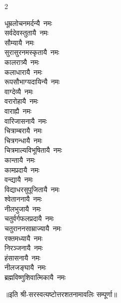 \begin{multicols}{2}
\begin{flushleft}
धूम्रलोचनमर्दन्यै~नमः\\
सर्वदेवस्तुतायै~नमः\\
सौम्यायै~नमः\\
सुरासुरनमस्कृतायै~नमः\\
कालरात्र्यै~नमः\\
कलाधारायै~नमः\\
रूपसौभाग्यदायिन्यै~नमः\\
वाग्देव्यै~नमः\\
वरारोहायै~नमः\hfill{}\\
वाराह्यै~नमः\\
वारिजासनायै~नमः\\
चित्राम्बरायै~नमः\\
चित्रगन्धायै~नमः\\
चित्रमाल्यविभूषितायै~नमः\\
कान्तायै~नमः\\
कामप्रदायै~नमः\\
वन्द्यायै~नमः\\
विद्याधरसुपूजितायै~नमः\\
श्वेताननायै~नमः\hfill{}\\
नीलभुजायै~नमः\\
चतुर्वर्गफलप्रदायै~नमः\\
चतुराननसाम्राज्यायै~नमः\\
रक्तमध्यायै~नमः\\
निरञ्जनायै~नमः\\
हंसासनायै~नमः\\
नीलजङ्घायै~नमः\\
ब्रह्मविष्णुशिवात्मिकायै~नमः\hfill{}\\
\end{flushleft}
\end{multicols}
॥इति श्री-सरस्वत्यष्टोत्तरशतनामावलिः सम्पूर्णा॥
